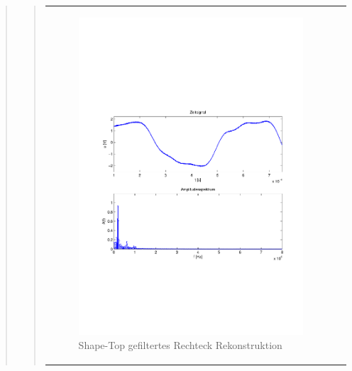 \begin{quote}
\begin{quote}
\begin{center}
\begin{tabular}{ll}
            \hspace{-5cm}
                \begin{minipage}{0.6\textwidth}
                    \begin{figure}[H]
                        \includegraphics[scale=0.55, trim = 16mm 70mm 16mm 85mm, clip]{Bilder/flatrecFil20_05}
                          \caption{Shape-Top gefiltertes Rechteck Rekonstruktion}
		                  \label{fig:flatrecFil20_05}
                    \end{figure}
                \end{minipage}
                

\end{tabular}
\end{center}
\end{quote}
\end{quote}
